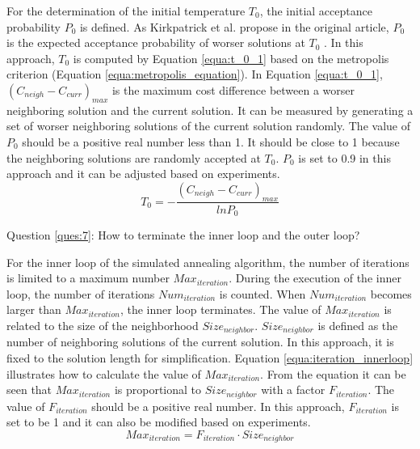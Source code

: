 		For the determination of the initial temperature $T_{0}$, the initial acceptance
		probability $P_{0}$ is defined.
		As Kirkpatrick et al. propose in the original article,
		$P_{0}$ is the expected acceptance probability of worser solutions at $T_{0}$
		\cite{10.2307/1690046}.
		In this approach, $T_{0}$ is computed by Equation \ref{equa:t_0_1} based
		on the metropolis criterion (Equation \ref{equa:metropolis_equation}).
		In Equation \ref{equa:t_0_1}, $\left( C_{neigh}-C_{curr} \right)_{max}$
		is the maximum cost difference between a worser neighboring solution and the current
		solution.
		It can be measured by generating a set of worser neighboring solutions of the
		current solution randomly.
		The value of $P_{0}$ should be a positive real number less than 1.
		It should be close to 1 because the neighboring solutions are randomly
		accepted at $T_{0}$.
		$P_{0}$ is set to 0.9 in this approach and it can be adjusted based on experiments.
		\begin{equation}
		\label{equa:t_0_1}
			T_{0}= - \frac{\left( C_{neigh}-C_{curr} \right)_{max} }{ln{P_{0}}}
		\end{equation}
		
		Question \ref{ques:7}: How to terminate the inner loop and the outer loop?
		
		For the inner loop of the simulated annealing algorithm, the
		number of iterations is limited to a maximum number $Max_{iteration}$.
		During the execution of the inner loop, the number of iterations
		$Num_{iteration}$ is counted.
		When $Num_{iteration}$ becomes larger than $Max_{iteration}$, the inner
		loop terminates.
		The value of $Max_{iteration}$ is related to the size of the
		neighborhood $Size_{neighbor}$. $Size_{neighbor}$ is defined as the number
		of neighboring solutions of the current solution.
		In this approach, it is fixed to the solution length for simplification.
		Equation \ref{equa:iteration_innerloop} illustrates how to calculate the value of $Max_{iteration}$.
		From the equation it can be seen that $Max_{iteration}$ is proportional
		to $Size_{neighbor}$ with a factor $F_{iteration}$.
		The value of $F_{iteration}$ should be a positive real number.
		In this approach, $F_{iteration}$ is set to be 1 and it can also be modified based on
		experiments.
		\begin{equation}
		\label{equa:iteration_innerloop}
			Max_{iteration}=F_{iteration} \cdot Size_{neighbor}
		\end{equation}
		

